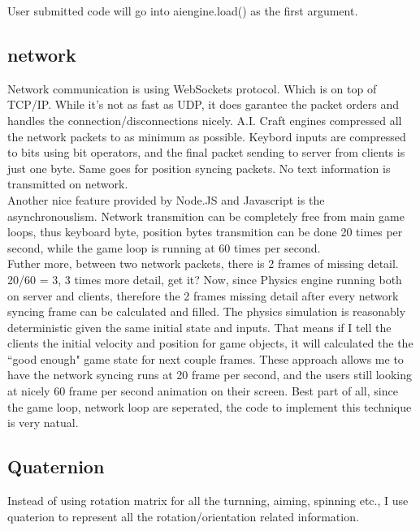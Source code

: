 \documentclass[12pt]{article}
\begin{document}
User submitted code will go into aiengine.load() as the first argument.
 
\subsection{network}

Network communication is using WebSockets protocol. Which is on top of TCP/IP. While it's not as fast as UDP, it does garantee the packet orders and handles the connection/disconnections nicely. A.I. Craft engines compressed all the network packets to as minimum as possible. Keybord inputs are compressed to bits using bit operators, and the final packet sending to server from clients is just one byte. Same goes for position syncing packets. No text information is transmitted on network.\\

Another nice feature provided by Node.JS and Javascript is the asynchronouslism. Network transmition can be completely free from main game loops, thus keyboard byte, position bytes transmition can be done 20 times per second, while the game loop is running at 60 times per second.\\

Futher more, between two network packets, there is 2 frames of missing detail. 20/60 = 3, 3 times more detail, get it? Now, since Physics engine running both on server and clients, therefore the 2 frames missing detail after every network syncing frame can be calculated and filled. The physics simulation is reasonably deterministic given the same initial state and inputs. That means if I tell the clients the initial velocity and position for game objects, it will calculated the the ``good enough" game state for next couple frames. These approach allows me to have the network syncing runs at 20 frame per second, and the users still looking at nicely 60 frame per second animation on their screen. Best part of all, since the game loop, network loop are seperated, the code to implement this technique is very natual.\\

\subsection{Quaternion}
Instead of using rotation matrix for all the turnning, aiming, spinning etc., I use quaterion to represent all the rotation/orientation related information.\\
\end{document}
